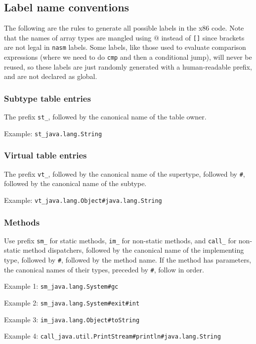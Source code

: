 \documentclass[12pt]{article}
\newcommand{\code}[1]{\texttt{#1}}
\begin{document}
\subsection{Label name conventions}

The following are the rules to generate all possible labels in the x86 code. Note that the names of array types are mangled using \code{$@$} instead of \code{[]} since brackets are not legal in \code{nasm} labels. Some labels, like those used to evaluate comparison expressions (where we need to do \code{cmp} and then a conditional jump), will never be reused, so these labels are just randomly generated with a human-readable prefix, and are not declared as global.

\subsubsection{Subtype table entries}

The prefix \code{st\_}, followed by the canonical name of the table owner.

Example: \code{st\_java.lang.String} 

\subsubsection{Virtual table entries}

The prefix \code{vt\_}, followed by the canonical name of the supertype, followed by \code{\#}, followed by the canonical name of the subtype.

Example: \code{vt\_java.lang.Object\#java.lang.String} 

\subsubsection{Methods}

Use prefix \code{sm\_} for static methods, \code{im\_} for non-static methods, and \code{call\_} for non-static method dispatchers, followed by the canonical name of the implementing type, followed by \code{\#}, followed by the method name. If the method has parameters, the canonical names of their types, preceded by \code{\#}, follow in order.

Example 1: \code{sm\_java.lang.System\#gc}

Example 2: \code{sm\_java.lang.System\#exit\#int} 

Example 3: \code{im\_java.lang.Object\#toString} 

Example 4: \code{call\_java.util.PrintStream\#println\#java.lang.String} 
\end{document}
